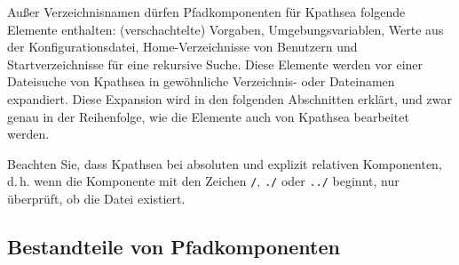 \documentclass[12pt,ngerman,a4paper,fullparskip]{scrreprt}
\newcommand{\cmdname}[1]{\texttt{#1}}
\newcommand{\code}[1]{\texttt{#1}}
\newcommand{\file}[1]{\texttt{#1}}
\newcommand{\KPS}{Kpathsea\xspace}
\newcommand{\var}[1]{\texttt{#1}}
\newcommand{\samp}[1]{\texttt{#1}}
\begin{document}
%

Außer Verzeichnisnamen dürfen Pfadkomponenten für {\KPS} folgende
Elemente enthalten: (verschachtelte) Vorgaben, Umgebungsvariablen,
Werte aus der Konfigurationsdatei, Home-Verzeichnisse von
Benutzern und Startverzeichnisse für eine rekursive Suche. Diese
Elemente werden vor einer Dateisuche von {\KPS} in gewöhnliche
Verzeichnis- oder Dateinamen expandiert. Diese Expansion wird in
den folgenden Abschnitten erklärt, und zwar genau in der
Reihenfolge, wie die Elemente auch von {\KPS} bearbeitet werden.

Beachten Sie, dass {\KPS} bei absoluten und explizit relativen Komponenten,
d.\,h. wenn die Komponente mit den Zeichen \samp{/}, \samp{./} oder
\samp{../} beginnt, nur überprüft, ob die Datei existiert.

%

\subsection{Bestandteile von Pfadkomponenten}
\label{sec:path-expansion}
\end{document}
